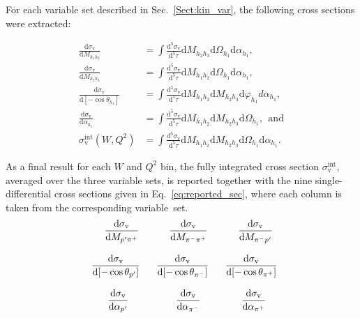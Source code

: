 \documentclass[prc,twocolumn,superscriptaddress,showpacs,amssymb,amsmath,amsfonts,aps,nofootinbib]{revtex4-1}
\begin{document}
For each variable set described in Sec.\!~\ref{Sect:kin_var}, the following cross sections were extracted:

\begin{equation}
\begin{aligned}
\frac{\textrm{d}\sigma_{\text{v}}}{\textrm{d}M_{h_{1}h_{2}}} & =\int\frac{\textrm{d}^{5}\sigma_{\text{v}}}{\textrm{d}^{5}\tau}\textrm{d}M_{h_{2}h_{3}}\textrm{d}\Omega_{h_{1}}\textrm{d}\alpha_{h_{1}}, \\
\frac{\textrm{d}\sigma_{\text{v}}}{\textrm{d}M_{h_{2}h_{3}}} & =\int\frac{\textrm{d}^{5}\sigma_{\text{v}}}{\textrm{d}^{5}\tau}\textrm{d}M_{h_{1}h_{2}}\textrm{d}\Omega_{h_{1}}\textrm{d}\alpha_{h_{1}}, \\
\frac{\textrm{d}\sigma_{\text{v}}}{\textrm{d}[-\cos\theta_{h_{1}}]} & =\int\frac{\textrm{d}^{5}\sigma_{\text{v}}}{\textrm{d}^{5}\tau}\textrm{d}M_{h_{1}h_{2}}\textrm{d}M_{h_{2}h_{3}}\textrm{d}\varphi_{h_{1}}d\alpha_{h_{1}}, \\
\frac{\textrm{d}\sigma_{\text{v}}}{\textrm{d}\alpha_{h_{1}}} & =\int\frac{\textrm{d}^{5}\sigma_{\text{v}}}{\textrm{d}^{5}\tau}\textrm{d}M_{h_{1}h_{2}}\textrm{d}M_{h_{2}h_{3}}\textrm{d}\Omega_{h_{1}},~~\text{and}\\
\sigma_{\text{v}}^{\text{int}} (W, Q^{2}) &= \int \frac{d^{5}\sigma_{\text{v}}}{\textrm{d}^{5}\tau}\textrm{d}M_{h_{1}h_{2}}\textrm{d}M_{h_{2}h_{3}}\textrm{d}\Omega_{h_{1}}\textrm{d}\alpha_{h_{1}}.
\end{aligned}
\label{inegr5diff}
\end{equation}


As a final result for each $W$ and $Q^{2}$ bin, the fully integrated cross section $\sigma_{\text{v}}^{\text{int}}$, averaged over the three variable sets, is reported together with the nine single-differential cross sections given in Eq.\!~\eqref{eq:reported_sec}, where each column is taken from the corresponding variable~set.
\begin{equation}
\begin{aligned}
&~~~~~~\frac{\textrm{\textrm{d}}\sigma_{\text{v}}}{\textrm{d}M_{p'\pi^{+}}}&&~~~~~~\frac{\textrm{d}\sigma_{\text{v}}}{\textrm{d}M_{\pi^{-}\pi^{+}}}&&~~~~~~\frac{\textrm{d}\sigma_{\text{v}}}{\textrm{d}M_{\pi^{-}p'}}\\[8pt] 
&~~\frac{\textrm{d}\sigma_{\text{v}}}{\textrm{d}[-\cos\theta_{p'}]}&&~~\frac{\textrm{d}\sigma_{\text{v}}}{\textrm{d}[-\cos\theta_{\pi^{-}}]}&&~~\frac{\textrm{d}\sigma_{\text{v}}}{\textrm{d}[-\cos\theta_{\pi^{+}}]}\\[8pt] 
&~~~~~~~\frac{\textrm{d}\sigma_{\text{v}}}{\textrm{d}\alpha_{p'}}&&~~~~~~~~\frac{\textrm{d}\sigma_{\text{v}}}{\textrm{d}\alpha_{\pi^{-}}}&&~~~~~~~\frac{\textrm{d}\sigma_{\text{v}}}{\textrm{d}\alpha_{\pi^{+}}}
\end{aligned}
\label{eq:reported_sec}
\end{equation}
\end{document}
